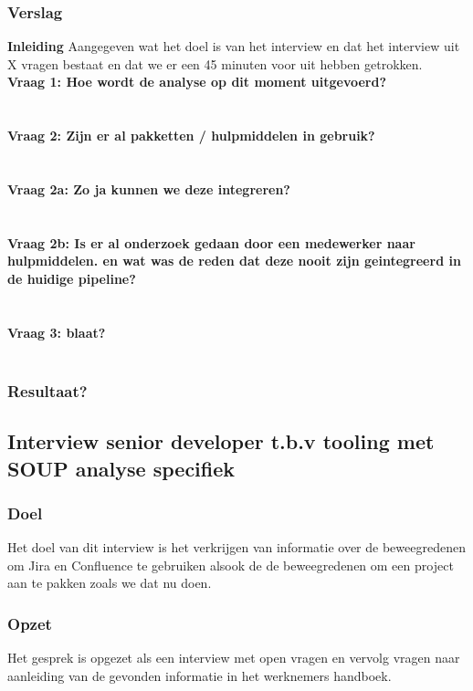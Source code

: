 \subsubsection{Verslag}
\textbf{Inleiding}
Aangegeven wat het doel is van het interview en dat het interview uit X vragen bestaat en dat we er een 45 minuten voor uit hebben getrokken.\\
\textbf{Vraag 1: Hoe wordt de analyse op dit moment uitgevoerd?}\\
\lipsum[01]\\
\\
\textbf{Vraag 2: Zijn er al pakketten / hulpmiddelen in gebruik?}\\
\lipsum[02]\\
\\
\textbf{Vraag 2a: Zo ja kunnen we deze integreren?}\\
\lipsum[03]\\
\\
\textbf{Vraag 2b: Is er al onderzoek gedaan door een medewerker naar hulpmiddelen. en wat was de reden dat deze nooit zijn geintegreerd in de huidige pipeline?}\\
\lipsum[04]\\
\\
\textbf{Vraag 3: blaat?}\\
\lipsum[05]\\

\subsubsection{Resultaat?}

\subsection{Interview senior developer t.b.v tooling met SOUP analyse specifiek}
\subsubsection{Doel}
Het doel van dit interview is het verkrijgen van informatie over de beweegredenen om Jira en Confluence te gebruiken alsook de de beweegredenen om een project aan te pakken zoals we dat nu doen.
\subsubsection{Opzet}
Het gesprek is opgezet als een interview met open vragen en vervolg vragen naar aanleiding van de gevonden informatie in het werknemers handboek.
